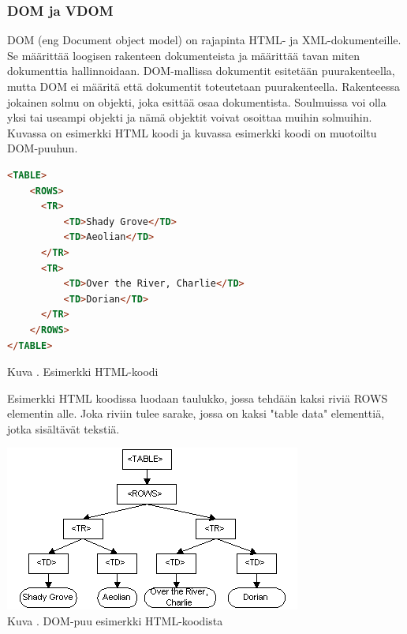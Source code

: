 \subsubsection{DOM ja VDOM}





DOM (eng Document object model) on rajapinta HTML- ja XML-dokumenteille. 
Se määrittää loogisen rakenteen dokumenteista ja määrittää tavan miten dokumenttia hallinnoidaan.
DOM-mallissa dokumentit esitetään puurakenteella, mutta DOM ei määritä että dokumentit toteutetaan puurakenteella.
Rakenteessa jokainen solmu on objekti, joka esittää osaa dokumentista. 
Soulmuissa voi olla yksi tai useampi objekti ja nämä objektit voivat osoittaa muihin solmuihin.
Kuvassa \nextImageCount{} on esimerkki HTML koodi ja kuvassa \nextnextImageCount {} esimerkki koodi on muotoiltu DOM-puuhun.
\bigskip



    
\begin{tcolorbox}
\begin{lstlisting}[language=html]
<TABLE>
    <ROWS> 
      <TR> 
          <TD>Shady Grove</TD>
          <TD>Aeolian</TD> 
      </TR> 
      <TR>
          <TD>Over the River, Charlie</TD>
          <TD>Dorian</TD> 
      </TR> 
    </ROWS>
</TABLE>
\end{lstlisting}
\end{tcolorbox}
Kuva \getImgCount. Esimerkki HTML-koodi
\medskip


Esimerkki HTML koodissa luodaan taulukko, jossa tehdään kaksi riviä ROWS elementin alle. 
Joka riviin tulee sarake, jossa on kaksi "table data"{} elementtiä, jotka sisältävät tekstiä.


\bigskip
\includegraphics{./src/public/oppar/dom.png}\\
Kuva \getImgCount {}. DOM-puu esimerkki HTML-koodista 
\medskip



